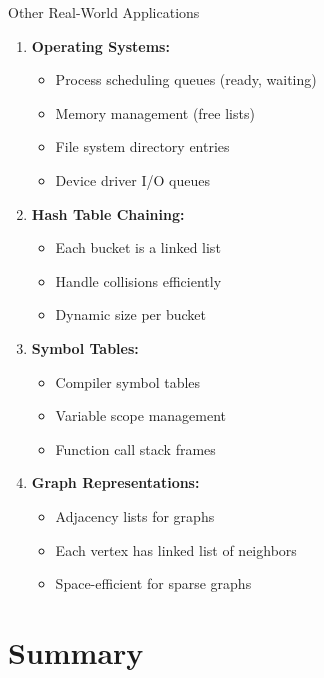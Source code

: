 \documentclass[aspectratio=169,xcolor=dvipsnames]{beamer}
\begin{document}
\begin{frame}{Other Real-World Applications}
  \begin{enumerate}
    \item \textbf{Operating Systems:}
    \begin{itemize}
      \item Process scheduling queues (ready, waiting)
      \item Memory management (free lists)
      \item File system directory entries
      \item Device driver I/O queues
    \end{itemize}

    \vspace{0.2cm}
    \item \textbf{Hash Table Chaining:}
    \begin{itemize}
      \item Each bucket is a linked list
      \item Handle collisions efficiently
      \item Dynamic size per bucket
    \end{itemize}

    \vspace{0.2cm}
    \item \textbf{Symbol Tables:}
    \begin{itemize}
      \item Compiler symbol tables
      \item Variable scope management
      \item Function call stack frames
    \end{itemize}

    \vspace{0.2cm}
    \item \textbf{Graph Representations:}
    \begin{itemize}
      \item Adjacency lists for graphs
      \item Each vertex has linked list of neighbors
      \item Space-efficient for sparse graphs
    \end{itemize}
  \end{enumerate}
\end{frame}

\section{Summary}
\end{document}
